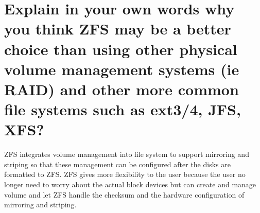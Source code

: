 \documentclass{article}
\begin{document}
\section{Explain in your own words why you think ZFS may be a better choice than using other physical volume management systems (ie RAID) and other more common file systems such as ext3/4, JFS, XFS?}
ZFS integrates volume management into file system to support mirroring and striping so that 
these management can be configured after the disks are formatted to ZFS. ZFS gives more flexibility
to the user because the user no longer need to worry about the actual block devices but can 
create and manage volume and let ZFS handle the checksum and the hardware configuration of mirroring and striping.
\end{document}
